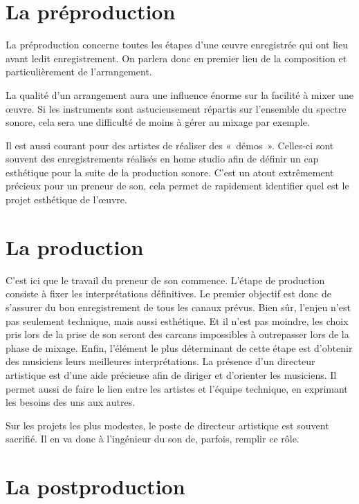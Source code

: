 \documentclass[
]{book}
\begin{document}
\hypertarget{la-pruxe9production}{%
\section{La préproduction}\label{la-pruxe9production}}

La préproduction concerne toutes les étapes d'une œuvre enregistrée qui ont lieu avant ledit enregistrement. On parlera donc en premier lieu de la composition et particulièrement de l'arrangement.

La qualité d'un arrangement aura une influence énorme sur la facilité à mixer une œuvre. Si les instruments sont astucieusement répartis sur l'ensemble du spectre sonore, cela sera une difficulté de moins à gérer au mixage par exemple.

Il est aussi courant pour des artistes de réaliser des «~démos~». Celles-ci sont souvent des enregistrements réalisés en home studio afin de définir un cap esthétique pour la suite de la production sonore. C'est un atout extrêmement précieux pour un preneur de son, cela permet de rapidement identifier quel est le projet esthétique de l'œuvre.

\hypertarget{la-production}{%
\section{La production}\label{la-production}}

C'est ici que le travail du preneur de son commence. L'étape de production consiste à fixer les interprétations définitives. Le premier objectif est donc de s'assurer du bon enregistrement de tous les canaux prévus. Bien sûr, l'enjeu n'est pas seulement technique, mais aussi esthétique. Et il n'est pas moindre, les choix pris lors de la prise de son seront des carcans impossibles à outrepasser lors de la phase de mixage. Enfin, l'élément le plus déterminant de cette étape est d'obtenir des musiciens leurs meilleures interprétations. La présence d'un directeur artistique est d'une aide précieuse afin de diriger et d'orienter les musiciens. Il permet aussi de faire le lien entre les artistes et l'équipe technique, en exprimant les besoins des uns aux autres.

Sur les projets les plus modestes, le poste de directeur artistique est souvent sacrifié. Il en va donc à l'ingénieur du son de, parfois, remplir ce rôle.

\hypertarget{la-postproduction}{%
\section{La postproduction}\label{la-postproduction}}
\end{document}

